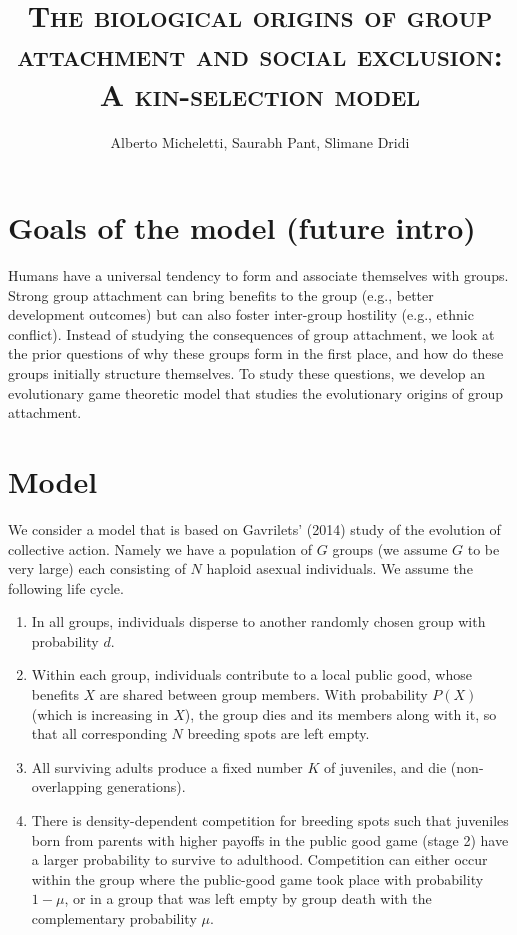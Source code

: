 \documentclass[11pt]{article} %
\title{\textsc{The biological origins of group attachment and social exclusion: A kin-selection model}} %
\author{Alberto Micheletti, Saurabh Pant, Slimane Dridi}
\newcommand{\gs}{N} %
\newcommand{\Ng}{G} %
\newcommand{\pd}{d} %
\newcommand{\Pg}{X} %
\newcommand{\Ps}{P} %
\newcommand{\no}{K} %
\newcommand{\pc}{\mu} %
\begin{document}
\maketitle



\section{Goals of the model (future intro)}

Humans have a universal tendency to form and associate themselves with groups. Strong group attachment can bring benefits to the group (e.g., better development outcomes) but can also foster inter-group hostility (e.g., ethnic conflict). Instead of studying the consequences of group attachment, we look at the prior questions of why these groups form in the first place, and how do these groups initially structure themselves. To study these questions, we develop an evolutionary game theoretic model that studies the evolutionary origins of group attachment.

\section{Model}

We consider a model that is based on Gavrilets' (2014) study of the evolution of collective action. Namely we have a population of $\Ng$ groups (we assume $\Ng$ to be very large) each consisting of $\gs$ haploid asexual individuals. We assume the following life cycle.
\begin{enumerate}[(1)]
    \item In all groups, individuals disperse to another randomly chosen group with probability $\pd$.
    \item Within each group, individuals contribute to a local public good, whose benefits $\Pg$ are shared between group members. With probability $\Ps(\Pg)$ (which is increasing in $\Pg$), the group dies and its members along with it, so that all corresponding $\gs$ breeding spots are left empty.
    \item All surviving adults produce a fixed number $\no$ of juveniles, and die (non-overlapping generations).
    \item There is density-dependent competition for breeding spots such that juveniles born from parents with higher payoffs in the public good game (stage 2) have a larger probability to survive to adulthood. Competition can either occur within the group where the public-good game took place with probability $1-\pc$, or in a group that was left empty by group death with the complementary probability $\pc$.
\end{enumerate}
\end{document}
